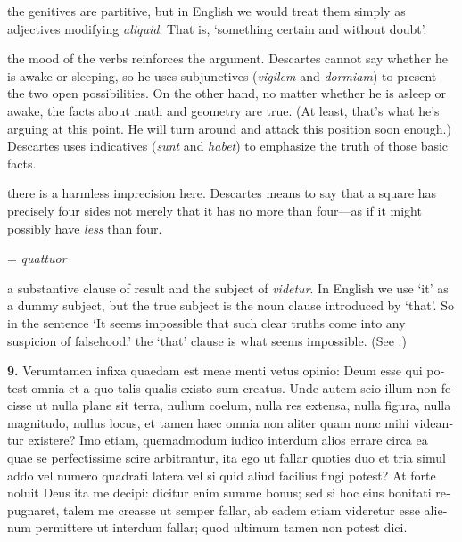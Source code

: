  the genitives are partitive, but in English we would treat them simply as adjectives modifying \textit{aliquid}. That is, `something certain and without doubt'.

 the mood of the verbs reinforces the argument. Descartes cannot say whether he is awake or sleeping, so he uses subjunctives (\textit{vigilem} and \textit{dormiam}) to present the two open possibilities. On the other hand, no matter whether he is asleep or awake, the facts about math and geometry are true. (At least, that's what he's arguing at this point. He will turn around and attack this position soon enough.) Descartes uses indicatives (\textit{sunt} and \textit{habet}) to emphasize the truth of those basic facts.

 there is a harmless imprecision here. Descartes means to say that a square has precisely four sides not merely that it has no more than four---as if it might possibly have \textit{less} than four.

 = \textit{quattuor}

 a substantive clause of result and the subject of \textit{videtur}. In English we use `it' as a dummy subject, but the true subject is the noun clause introduced by `that'. So in the sentence `It seems impossible that such clear truths come into any suspicion of falsehood.' the `that' clause is what seems impossible. (See \citet[218]{huddleston2005}.)

\clearpage

\beginnumbering
\pstart
\begin{latin}
    \textenglish{\textbf{9.}} Verumtamen infixa quaedam est meae menti vetus opinio: Deum esse qui potest omnia et a quo talis qualis existo sum creatus. Unde autem scio illum non fecisse ut nulla plane sit terra, nullum coelum, nulla res extensa, nulla figura, nulla magnitudo, nullus locus, et tamen haec omnia non aliter quam nunc mihi videantur existere? Imo etiam, quemadmodum iudico interdum alios errare circa ea quae se perfectissime scire arbitrantur, ita ego ut fallar quoties duo et tria simul addo vel numero quadrati latera vel si quid aliud facilius fingi potest? At forte noluit Deus ita me decipi: dicitur enim summe bonus; sed si hoc eius bonitati repugnaret, talem me creasse ut semper fallar, ab eadem etiam videretur esse alienum permittere ut interdum fallar; quod ultimum tamen non potest dici.
\end{latin}
\pend
\endnumbering


